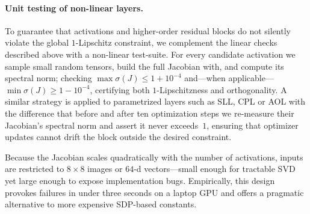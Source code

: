\documentclass[10pt]{article}
\theoremstyle{plain}
\theoremstyle{definition}
\theoremstyle{remark}
\begin{document}
    \paragraph{Unit testing of non-linear layers.}
    To guarantee that activations and higher-order residual blocks do not silently violate the global $1$-Lipschitz constraint, we complement the linear checks described above with a non-linear test-suite.  
    For every candidate activation we sample small random tensors, build the full Jacobian with, and compute its spectral norm; checking $\max\sigma(J)\le1+10^{-4}$ and—when applicable— $\min\sigma(J)\ge1-10^{-4}$, certifying both $1$-Lipschitzness and orthogonality.  
    A similar strategy is applied to parametrized layers such as SLL, CPL or AOL \cite{araujo_unified_2023, xiao_dynamical_2018, prach_almost-orthogonal_2022} with the difference that before and after ten optimization steps we re-measure their Jacobian’s spectral norm and assert it never exceeds~$1$, ensuring that optimizer updates cannot drift the block outside the desired constraint.  
    
    Because the Jacobian scales quadratically with the number of activations, inputs are restricted to $8 \times 8$ images or $64$-d vectors—small enough for tractable SVD yet large enough to expose implementation bugs. Empirically, this design provokes failures in under three seconds on a laptop GPU and offers a pragmatic alternative to more expensive SDP-based constants.
    
\end{document}
